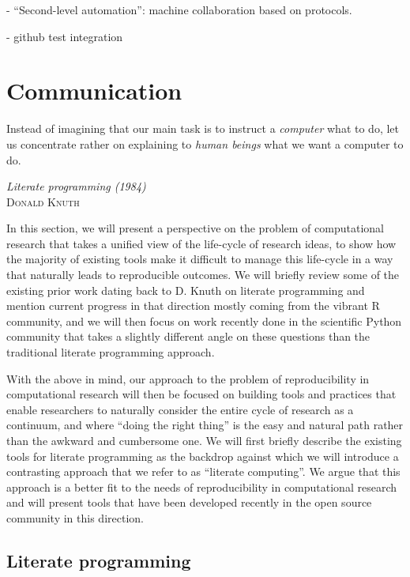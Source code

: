 \documentclass[ChapterTOCs,krantz2]{krantz} %
\theoremstyle{definition}
\begin{document}
- ``Second-level automation'': machine collaboration based on protocols.

- github test integration



\section{\label{sec:communication}Communication}

\setlength{\epigraphrule}{0pt}
\setlength{\epigraphwidth}{.90\textwidth}
\epigraph%
{%
Instead of imagining that our main task is to instruct a \emph{computer}
what to do, let us concentrate rather on explaining to \emph{human beings}
what we want a computer to do.
}%
{\textit{Literate programming (1984)}\\ \textsc{Donald Knuth} }

In this section, we will present a perspective on the problem of
computational research that takes a unified view of the life-cycle of research
ideas, to show how the majority of existing tools make it difficult to manage
this life-cycle in a way that naturally leads to reproducible outcomes.  We
will briefly review some of the existing prior work dating back to D. Knuth on
literate programming \cite{Knuth92} and mention current progress in that
direction mostly coming from the vibrant R community, and we will then focus on
work recently done in the scientific Python community that takes a slightly
different angle on these questions than the traditional literate programming
approach.


With the above in mind, our approach to the problem of reproducibility in
computational research will then be focused on building tools and practices
that enable researchers to naturally consider the entire cycle of research as a
continuum, and where ``doing the right thing'' is the easy and natural path
rather than the awkward and cumbersome one.  We will first briefly describe the
existing tools for literate programming as the backdrop against which we will
introduce a contrasting approach that we refer to as ``literate computing''.
We argue that this approach is a better fit to the needs of reproducibility in
computational research and will present tools that have been developed recently
in the open source community in this direction.



\subsection{Literate programming}
\end{document}
